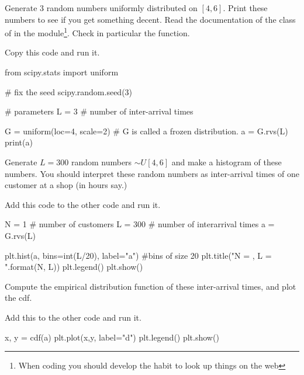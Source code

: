 \begin{exercise}
  Generate 3 random numbers uniformly distributed on $[4,6]$.  Print these numbers to see if you get something decent. Read the documentation of
the  class of in the  module\footnote{When coding you should develop the habit to look up things on the web}.  Check in particular the  function. 

\begin{solution}
Copy this code and run it.
\begin{pyverbatim}
from scipy.stats import uniform

# fix the seed
scipy.random.seed(3) 

# parameters
L = 3  # number of inter-arrival times

G = uniform(loc=4, scale=2) # G is called a frozen distribution.
a = G.rvs(L)
print(a)
\end{pyverbatim}
  
\end{solution}

\end{exercise}


\begin{exercise}
Generate $L=300$ random numbers $\sim U[4,6]$ and make a histogram of these numbers. You should interpret these random numbers as inter-arrival times of one customer at a shop (in hours say.)
\begin{solution}
Add this code to the other code and run it.
\begin{pyverbatim}
N = 1 # number of customers
L = 300 # number of interarrival times
a = G.rvs(L)

plt.hist(a, bins=int(L/20), label="a") #bins of size 20
plt.title("N = {}, L = {}".format(N, L))
plt.legend()
plt.show()
\end{pyverbatim}
\end{solution}
\end{exercise}

\begin{exercise}
Compute  the empirical distribution function of these inter-arrival times, and plot the cdf.
\begin{solution}
Add this to the other code and run it.
\begin{pyverbatim}
x, y = cdf(a)
plt.plot(x,y,  label="d")
plt.legend()
plt.show()
\end{pyverbatim}
\end{solution}
\end{exercise}

